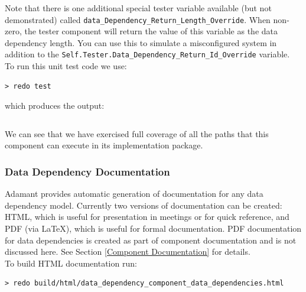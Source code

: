 Note that there is one additional special tester variable available (but not demonstrated) called \texttt{data\_Dependency\_Return\_Length\_Override}. When non-zero, the tester component will return the value of this variable as the data dependency length. You can use this to simulate a misconfigured system in addition to the \texttt{Self.Tester.Data\_Dependency\_Return\_Id\_Override} variable. \\

To run this unit test code we use:

\vspace{5mm} %
\begin{verbatim}
> redo test
\end{verbatim}
\vspace{5mm} %

which produces the output:

\vspace{5mm} %
\inputminted{text}{../example_architecture/data_dependency_component/test/output.txt}
\vspace{5mm} %

We can see that we have exercised full coverage of all the paths that this component can execute in its implementation package.

\subsubsection{Data Dependency Documentation}

Adamant provides automatic generation of documentation for any data dependency model. Currently two versions of documentation can be created: HTML, which is useful for presentation in meetings or for quick reference, and PDF (via \LaTeX), which is useful for formal documentation. PDF documentation for data dependencies is created as part of component documentation and is not discussed here. See Section \ref{Component Documentation} for details. \\

To build HTML documentation run:

\vspace{5mm} %
\begin{verbatim}
> redo build/html/data_dependency_component_data_dependencies.html
\end{verbatim}
\vspace{5mm} %

